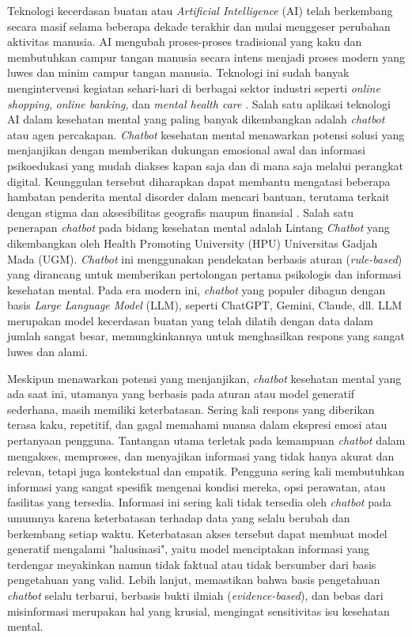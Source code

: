 Teknologi kecerdasan buatan atau \textit{Artificial Intelligence} (AI) telah berkembang secara masif selama beberapa dekade terakhir dan mulai menggeser perubahan aktivitas manusia.
AI mengubah proses-proses tradisional yang kaku dan membutuhkan campur tangan manusia secara intens menjadi proses modern yang luwes dan minim campur tangan manusia.
Teknologi ini sudah banyak mengintervensi kegiatan sehari-hari di berbagai sektor industri seperti \textit{online shopping}, \textit{online banking}, dan \textit{mental health care} \cite{MultiIndustryAIChatbot}.
Salah satu aplikasi teknologi AI dalam kesehatan mental yang paling banyak dikembangkan adalah \textit{chatbot} atau agen percakapan.
\textit{Chatbot} kesehatan mental menawarkan potensi solusi yang menjanjikan dengan memberikan dukungan emosional awal dan informasi psikoedukasi yang mudah diakses kapan saja dan di mana saja melalui perangkat digital.
Keunggulan tersebut diharapkan dapat membantu mengatasi beberapa hambatan penderita mental disorder dalam mencari bantuan, terutama terkait dengan stigma dan aksesibilitas geografis maupun finansial \cite{CBTWoebotTest}.
Salah satu penerapan \textit{chatbot} pada bidang kesehatan mental adalah Lintang \textit{Chatbot} yang dikembangkan oleh Health Promoting University (HPU) Universitas Gadjah Mada (UGM).
\textit{Chatbot} ini menggunakan pendekatan berbasis aturan (\textit{rule-based}) yang dirancang untuk memberikan pertolongan pertama psikologis dan informasi kesehatan mental.
Pada era modern ini, \textit{chatbot} yang populer dibagun dengan basis \textit{Large Language Model} (LLM), seperti ChatGPT, Gemini, Claude, dll.
LLM merupakan model kecerdasan buatan yang telah dilatih dengan data dalam jumlah sangat besar, memungkinkannya untuk menghasilkan respons yang sangat luwes dan alami.

Meskipun menawarkan potensi yang menjanjikan, \textit{chatbot} kesehatan mental yang ada saat ini, utamanya yang berbasis pada aturan atau model generatif sederhana, masih memiliki keterbatasan.
Sering kali respons yang diberikan terasa kaku, repetitif, dan gagal memahami nuansa dalam ekspresi emosi atau pertanyaan pengguna.
Tantangan utama terletak pada kemampuan \textit{chatbot} dalam mengakses, memproses, dan menyajikan informasi yang tidak hanya akurat dan relevan, tetapi juga kontekstual dan empatik.
Pengguna sering kali membutuhkan informasi yang sangat spesifik mengenai kondisi mereka, opsi perawatan, atau fasilitas yang tersedia.
Informasi ini sering kali tidak tersedia oleh \textit{chatbot} pada umumnya karena keterbatasan terhadap data yang selalu berubah dan berkembang setiap waktu.
Keterbatasan akses tersebut dapat membuat model generatif mengalami "halusinasi", yaitu model menciptakan informasi yang terdengar meyakinkan namun tidak faktual atau tidak bersumber dari basis pengetahuan yang valid.
Lebih lanjut, memastikan bahwa basis pengetahuan \textit{chatbot} selalu terbarui, berbasis bukti ilmiah (\textit{evidence-based}), dan bebas dari misinformasi merupakan hal yang krusial, mengingat sensitivitas isu kesehatan mental.

